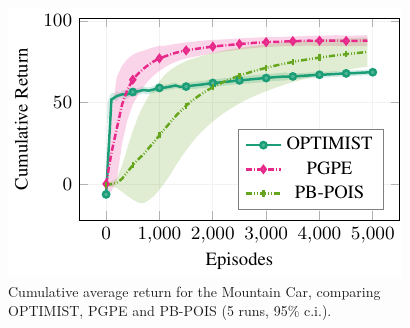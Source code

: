 \documentclass{article}
\makeatletter
\DeclareRobustCommand{\algoname}{OPTIMIST\@\xspace}
\makeatother
\begin{document}
\begin{figure}[t]
\begin{minipage}[b]{0.32\linewidth}
    \label{fig:rs} 
   \end{minipage} %
    \hspace{0.2cm}
  \begin{minipage}[b]{0.32\linewidth}
    \centering
    \vspace{-0.2cm}
    \includegraphics[width=\linewidth]{plots/mc/plot.pdf}
    \vspace{-0.5cm}
    \caption{Cumulative average return for the Mountain Car, comparing \algoname, PGPE and PB-POIS (5 runs, 95\% c.i.).} 
    \label{fig:mc} 
  \end{minipage} %
  \vskip -0.2in
\end{figure}


%
 
\end{document}

